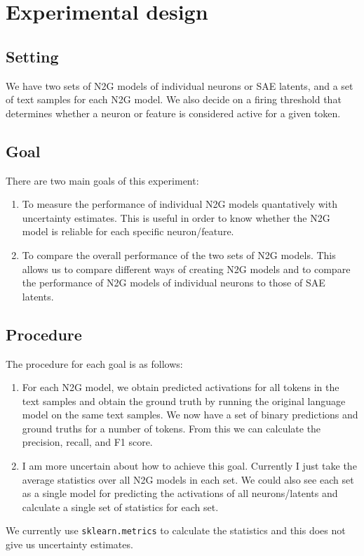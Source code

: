 \documentclass[main.tex]{subfiles}
\begin{document}
\section{Experimental design}
\subsection{Setting}
We have two sets of N2G models of individual neurons or SAE latents, 
and a set of text samples for each N2G model.
We also decide on a firing threshold that determines 
whether a neuron or feature is considered active for a given token.
\subsection{Goal}
There are two main goals of this experiment:
\begin{enumerate}
    \item To measure the performance of individual N2G models 
    quantatively with uncertainty estimates.
    This is useful in order to know 
    whether the N2G model is reliable for each specific neuron/feature.
    \item To compare the overall performance of the two sets of N2G models.
    This allows us to compare different ways of creating N2G models 
    and to compare the performance of N2G models of individual neurons 
    to those of SAE latents.
\end{enumerate}
\subsection{Procedure}
The procedure for each goal is as follows:
\begin{enumerate}
    \item For each N2G model, 
    we obtain predicted activations for all tokens in the text samples 
    and obtain the ground truth by running the original language model 
    on the same text samples.
    We now have a set of binary predictions and ground truths 
    for a number of tokens.
    From this we can calculate the precision, recall, and F1 score.
    \item I am more uncertain about how to achieve this goal.
    Currently I just take the average statistics over all N2G models 
    in each set.
    We could also see each set as a single model for predicting 
    the activations of all neurons/latents 
    and calculate a single set of statistics for each set.
\end{enumerate}
We currently use \texttt{sklearn.metrics} to calculate the statistics 
and this does not give us uncertainty estimates.
\end{document}
